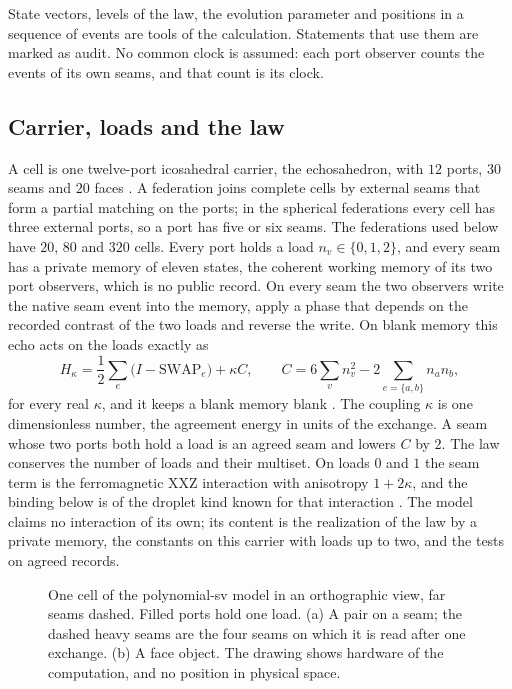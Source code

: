 State vectors, levels of the law, the evolution parameter and positions in a sequence of
events are tools of the calculation. Statements that use them are marked as audit. No
common clock is assumed: each port observer counts the events of its own seams, and that
count is its clock.

\subsection{Carrier, loads and the law}

A cell is one twelve-port icosahedral carrier, the echosahedron, with $12$ ports, $30$
seams and $20$ faces \cite{ophmicro}. A federation joins complete cells by external
seams that form a partial matching on the ports; in the spherical federations every
cell has three external ports, so a port has five or six seams. The federations used
below have $20$, $80$ and $320$ cells. Every port holds a load $n_v\in\{0,1,2\}$, and
every seam has a private memory of eleven states, the coherent working memory of its two
port observers, which is no public record. On every seam the two observers write the
native seam event into the memory, apply a phase that depends on the recorded contrast
of the two loads and reverse the write. On blank memory this echo acts on the loads
exactly as
\begin{equation}
 H_\kappa=\frac12\sum_e\bigl(I-\mathrm{SWAP}_e\bigr)+\kappa C,\qquad
 C=6\sum_v n_v^2-2\sum_{e=\{a,b\}}n_an_b,
 \label{eq:psv-law}
\end{equation}
for every real $\kappa$, and it keeps a blank memory blank \cite{ophmodel}. The coupling
$\kappa$ is one dimensionless number, the agreement energy in units of the exchange. A
seam whose two ports both hold a load is an agreed seam and lowers $C$ by $2$. The law
conserves the number of loads and their multiset. On loads $0$ and $1$ the seam term is
the ferromagnetic XXZ interaction with anisotropy $1+2\kappa$, and the binding below is
of the droplet kind known for that interaction
\cite{nachtergaele2001,fischbacher2018}. The model claims no interaction of its own;
its content is the realization of the law by a private memory, the constants on this
carrier with loads up to two, and the tests on agreed records.

\begin{figure}[!htb]
\centering

\caption{One cell of the polynomial-sv model in an orthographic view, far seams dashed.
Filled ports hold one load. (a) A pair on a seam; the dashed heavy seams are the four
seams on which it is read after one exchange. (b) A face object. The drawing shows
hardware of the computation, and no position in physical space.}
\label{fig:psv-cell}
\end{figure}

